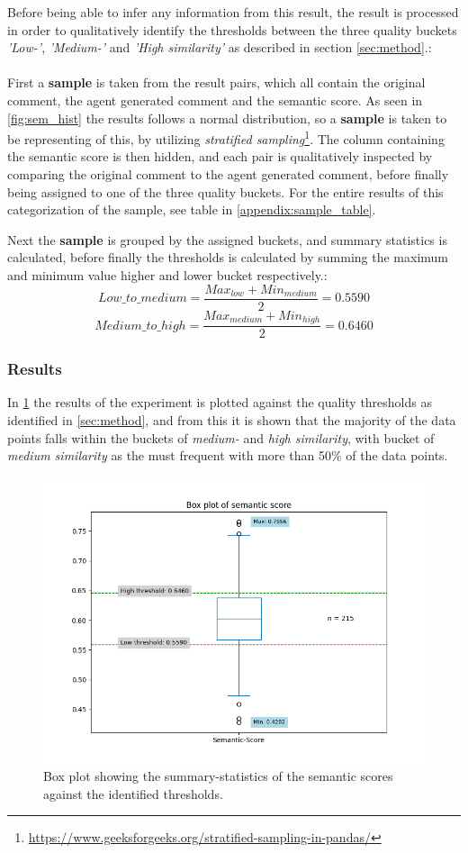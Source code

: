 Before being able to infer any information from this result, the result is processed in order to qualitatively identify the thresholds between the three quality buckets \textit{'Low-'}, \textit{'Medium-'} and \textit{'High similarity'} as described in section \cref{sec:method}.:
\\\\
First a \textbf{sample} is taken from the result pairs, which all contain the original comment, the agent generated comment and the semantic score. As seen in \cref{fig:sem_hist} the results follows a normal distribution, so a \textbf{sample} is taken to be representing of this, by utilizing \textit{stratified sampling}\footnote{\url{https://www.geeksforgeeks.org/stratified-sampling-in-pandas/}}. The column containing the semantic score is then hidden, and each pair is qualitatively inspected by comparing the original comment to the agent generated comment, before finally being assigned to one of the three quality buckets. For the entire results of this categorization of the sample, see table in \cref{appendix:sample_table}.

Next the \textbf{sample} is grouped by the assigned buckets, and summary statistics is calculated, before finally the thresholds is calculated by summing the maximum and minimum value higher and lower bucket respectively.:
\[
Low\_to\_medium = \frac{Max_{low}+Min_{medium}}{2} = 0.5590
\]
\[
Medium\_to\_high = \frac{Max_{medium}+Min_{high}}{2} = 0.6460
\]

\subsubsection{Results}
In \cref{fig:sem_box} the results of the experiment is plotted against the quality thresholds as identified in \cref{sec:method}, and from this it is shown that the majority of the data points falls within the buckets of \textit{medium-} and \textit{high similarity}, with bucket of \textit{medium similarity} as the must frequent with more than 50\% of the data points.

\label{sec:sem_results}
\begin{figure}[H]
\centering
\includegraphics[width=0.7\linewidth]{Figures/semantic_score_box_plot.png}
\caption{Box plot showing the summary-statistics of the semantic scores against the identified thresholds.}
\label{fig:sem_box}
\end{figure}

